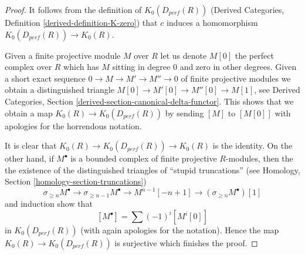 \documentclass[10pt,a4paper]{amsart}
\theoremstyle{plain}
\theoremstyle{definition}
\theoremstyle{remark}
\numberwithin{equation}{subsection}
\begin{document}
\begin{proof}
It follows from the definition of $K_0(D_{perf}(R))$
(Derived Categories, Definition \ref{derived-definition-K-zero})
that $c$ induces a homomorphism $K_0(D_{perf}(R)) \to K_0(R)$.

\medskip\noindent
Given a finite projective module $M$ over $R$ let us denote
$M[0]$ the perfect complex over $R$ which has $M$ sitting in degree $0$
and zero in other degrees. Given a short exact sequence
$0 \to M \to M' \to M'' \to 0$ of finite projective modules
we obtain a distinguished triangle $M[0] \to M'[0] \to M''[0] \to M[1]$, see
Derived Categories, Section \ref{derived-section-canonical-delta-functor}.
This shows that we obtain a map $K_0(R) \to K_0(D_{perf}(R))$
by sending $[M]$ to $[M[0]]$ with apologies for the horrendous notation.

\medskip\noindent
It is clear that $K_0(R) \to K_0(D_{perf}(R)) \to K_0(R)$ is the identity.
On the other hand, if $M^\bullet$ is a bounded complex of finite projective
$R$-modules, then the the existence of the distinguished triangles
of ``stupid truncations''
(see Homology, Section \ref{homology-section-truncations})
$$
\sigma_{\geq n}M^\bullet \to \sigma_{\geq n - 1}M^\bullet \to
M^{n - 1}[-n + 1] \to (\sigma_{\geq n}M^\bullet)[1]
$$
and induction show that
$$
[M^\bullet] = \sum (-1)^i[M^i[0]]
$$
in $K_0(D_{perf}(R))$ (with again apologies for the notation).
Hence the map $K_0(R) \to K_0(D_{perf}(R))$ is surjective which
finishes the proof.
\end{proof}
\end{document}
